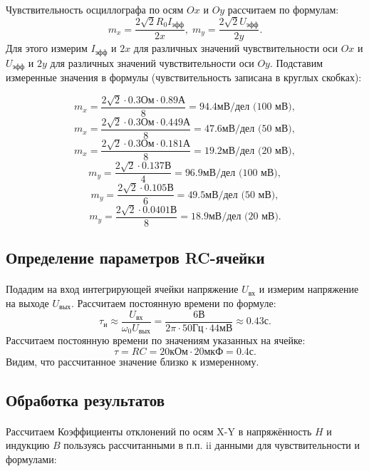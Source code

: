 \documentclass[a4paper,12pt]{article} %
\begin{document}
\paragraph{} Чувствительность осциллографа по осям $Ox$ и $Oy$ рассчитаем по формулам:
\[ m_x = \frac{2 \sqrt{2} R_0 I_\text{эфф}}{2x}, \; m_y = \frac{2 \sqrt{2} U_\text{эфф}}{2y}.
\]
Для этого измерим $I_\text{эфф}$ и $2x$ для различных значений чувствительности оси $Ox$ и $U_\text{эфф}$ и $2y$ для различных значений чувствительности оси $Oy$. Подставим измеренные значения в формулы (чувствительность записана в круглых скобках):

\[ m_x = \frac{2 \sqrt{2} \cdot 0.3 \text{Ом} \cdot 0.89 \text{А}}{8} = 94.4 \text{мВ/дел (100 мВ)}, \]
\[ m_x = \frac{2 \sqrt{2} \cdot 0.3 \text{Ом} \cdot 0.449 \text{А}}{8} = 47.6 \text{мВ/дел (50 мВ)}, \]
\[ m_x = \frac{2 \sqrt{2} \cdot 0.3 \text{Ом} \cdot 0.181 \text{А}}{8} = 19.2 \text{мВ/дел (20 мВ)}, \]
\[ m_y = \frac{2 \sqrt{2} \cdot 0.137 \text{В}}{4} = 96.9 \text{мВ/дел (100 мВ)}, \]
\[ m_y = \frac{2 \sqrt{2} \cdot 0.105 \text{В}}{6} = 49.5 \text{мВ/дел (50 мВ)}, \]
\[ m_y = \frac{2 \sqrt{2} \cdot 0.0401 \text{В}}{8} = 18.9 \text{мВ/дел (20 мВ)}. \]

\subsection{Определение параметров RC-ячейки}

\paragraph{} Подадим на вход интегрирующей ячейки напряжение $U_\text{вх}$ и измерим напряжение на выходе $U_\text{вых}$. Рассчитаем постоянную времени по формуле:
 \[ \tau_\text{и} \approx \frac{U_\text{вх}}{\omega_0 U_\text{вых}} = \frac{6 \text{В}}{2 \pi \cdot 50 \text{Гц} \cdot 44 \text{мВ}} \approx 0.43 \text{с}. \]
Рассчитаем постоянную времени по значениям указанных на ячейке:
\[ \tau = RC = 20 \text{кОм} \cdot 20 \text{мкФ} = 0.4 \text{с}. \]
Видим, что рассчитанное значение близко к измеренному.

\subsection{Обработка результатов}

\paragraph{} Рассчитаем Коэффициенты отклонений по осям X-Y в напряжённость $H$ и индукцию  $B$ пользуясь рассчитанными в п.п. ii данными для чувствительности и формулами:
\end{document}
